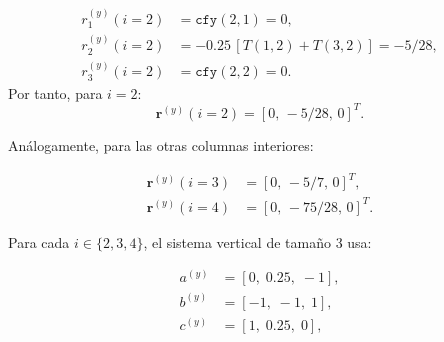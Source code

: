 \documentclass[11pt,a4paper]{article}
\begin{document}
\begin{center}
\begin{minipage}[c]{0.62\textwidth}
\begin{equation}
\begin{aligned}
r_1^{(y)}(i=2) &= \texttt{cfy}(2,1)=0,\\
r_2^{(y)}(i=2) &= -0.25\,[T(1,2)+T(3,2)] = -5/28,\\
r_3^{(y)}(i=2) &= \texttt{cfy}(2,2)=0.
\end{aligned}
\end{equation}
Por tanto, para \(i=2\):
\begin{equation}
\mathbf r^{(y)}(i=2)=[0,\,-5/28,\,0]^T.
\end{equation}
\end{minipage}
\hfill
\begin{minipage}[c]{0.34\textwidth}
\centering
{}
\end{minipage}
\end{center}

An\'alogamente, para las otras columnas interiores:

\begin{equation}
\begin{aligned}
\mathbf r^{(y)}(i=3) &= [0,\,-5/7,\,0]^T,\\
\mathbf r^{(y)}(i=4) &= [0,\,-75/28,\,0]^T.
\end{aligned}
\end{equation}

Para cada \(i\in\{2,3,4\}\), el sistema vertical de tama\~no 3 usa:

\begin{equation}
\begin{aligned}
a^{(y)} &= [0,\;0.25,\;-1],\\
b^{(y)} &= [-1,\;-1,\;1],\\
c^{(y)} &= [1,\;0.25,\;0],
\end{aligned}
\end{equation}
\end{document}

